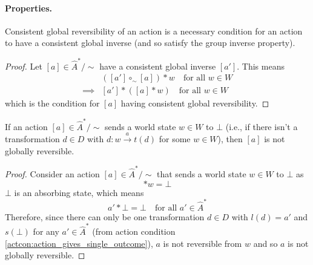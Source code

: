 \paragraph{Properties. }

\begin{proposition}\label{prp:consistent_global_reversibility_necessary_for_consistent_global_inverse}
    Consistent global reversibility of an action is a necessary condition for an action to have a consistent global inverse (and so satisfy the group inverse property).
\end{proposition}
\begin{proof}
    Let $[a] \in \hat{A}^{*}/\sim$ have a consistent global inverse $[a']$.
    This means
    \begin{align}
        & ([a'] \circ_{\sim} [a]) \ast w \quad \text{for all $w \in W$} \\
        \implies & [a'] \ast ([a] \ast w) \quad \text{for all $w \in W$}
    \end{align}
    which is the condition for $[a]$ having consistent global reversibility.
\end{proof}

\begin{proposition}\label{prp:undefined_action_not_globally_reversible}
    If an action $[a] \in \hat{A}^{*}/\sim$ sends a world state $w \in W$ to $\bot$ (i.e., if there isn't a transformation $d \in D$ with $d: w \xrightarrow{a} t(d)$ for some $w \in W$), then $[a]$ is not globally reversible.
\end{proposition}
\begin{proof}
    Consider an action $[a] \in \hat{A}^{*}/\sim$ that sends a world state $w \in W$ to $\bot$ as
    \begin{equation}
        [a] * w = \bot
    \end{equation}
    $\bot$ is an absorbing state, which means
    \begin{equation}
        a' * \bot = \bot \quad \text{for all $a' \in \hat{A}^{*}$}
    \end{equation}
    Therefore, since there can only be one transformation $d \in D$ with $l(d) = a'$ and $s(\bot)$ for any $a' \in \hat{A}^{*}$ (from action condition \ref{actcon:action_gives_single_outcome}), $a$ is not reversible from $w$ and so $a$ is not globally reversible.
\end{proof}

